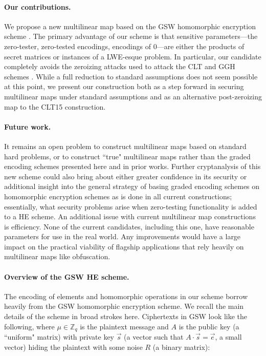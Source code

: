 \paragraph{Our contributions.}  We propose a new multilinear map based on the GSW homomorphic encryption scheme \cite{gsw}.  The primary advantage of our scheme is that sensitive parameters---the zero-tester, zero-tested encodings, encodings of $0$---are either the products of secret matrices or instances of a LWE-esque problem.  In particular, our candidate completely avoids the zeroizing attacks used to attack the CLT and GGH schemes \cite{chl, cgh, hj}.  While a full reduction to standard assumptions does not seem possible at this point, we present our construction both as a step forward in securing multilinear maps under standard assumptions and as an alternative post-zeroizing map to the CLT15 construction.

\paragraph{Future work.}  It remains an open problem to construct multilinear maps based on standard hard problems, or to construct ``true" multilinear maps rather than the graded encoding schemes presented here and in prior works.  Further cryptanalysis of this new scheme could also bring about either greater confidence in its security or additional insight into the general strategy of basing graded encoding schemes on homomorphic encryption schemes as is done in all current constructions; essentially, what security problems arise when zero-testing functionality is added to a HE scheme.  An additional issue with current multilinear map constructions is efficiency.  None of the current candidates, including this one, have reasonable parameters for use in the real world.  Any improvements would have a large impact on the practical viability of flagship applications that rely heavily on multilinear maps like obfuscation.

\paragraph{Overview of the GSW HE scheme.}  The encoding of elements and homomorphic operations in our scheme borrow heavily from the GSW homomorphic encryption scheme.  We recall the main details of the scheme in broad strokes here.  Ciphertexts in GSW look like the following, where $\mu \in \mathbb{Z}_q$ is the plaintext message and $A$ is the public key (a ``uniform" matrix) with private key $\vec{s}$ (a vector such that $A\cdot \vec{s} = \vec{e}$, a small vector) hiding the plaintext with some noise $R$ (a binary matrix):

